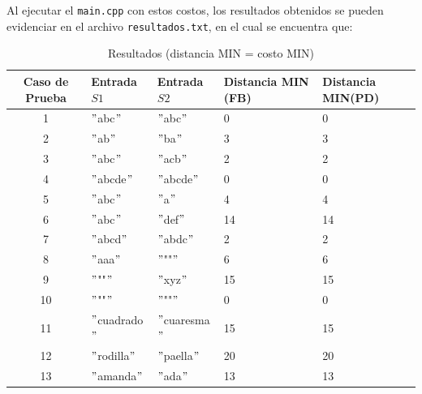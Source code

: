 Al ejecutar el \verb|main.cpp| con estos costos, los resultados obtenidos se pueden evidenciar en el archivo \verb|resultados.txt|, en el cual se encuentra que:

\begin{table}[H]
    \centering
    \footnotesize
    \begin{tabular}{|c|l|l|l|l|}
    \hline
    \textbf{Caso de Prueba} & \textbf{Entrada \( S1 \)} & \textbf{Entrada \( S2 \)} & \textbf{Distancia MIN (FB)} & \textbf{Distancia MIN(PD)} \\
    \hline
    1 & $"$abc$"$ & $"$abc$"$ & 0 & 0 \\
    2 & $"$ab$"$ & $"$ba$"$ & 3 & 3 \\
    3 & $"$abc$"$ & $"$acb$"$ & 2 & 2 \\
    4 & $"$abcde$"$ & $"$abcde$"$ & 0 & 0 \\
    5 & $"$abc$"$ & $"$a$"$ & 4 & 4 \\
    6 & $"$abc$"$ & $"$def$"$ & 14 & 14 \\
    7 & $"$abcd$"$ & $"$abdc$"$ & 2 & 2 \\
    8 & $"$aaa$"$ & $"$""$"$ & 6 & 6 \\
    9 & $"$""$"$ & $"$xyz$"$ & 15 & 15 \\
    10 & $"$""$"$ & $"$""$"$ & 0 & 0 \\
    11 & $"$cuadrado$"$ & $"$cuaresma$"$ & 15 & 15 \\
    12 & $"$rodilla$"$ & $"$paella$"$ & 20 & 20 \\
    13 & $"$amanda$"$ & $"$ada$"$ & 13 & 13 \\
    \hline
    \end{tabular}
    \caption{Resultados (distancia MIN = costo MIN)}
    \label{fig:resultados}
\end{table}

